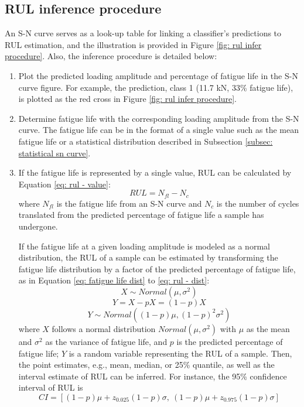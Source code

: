 \subsection{RUL inference procedure}
An S-N curve serves as a look-up table for linking a classifier's predictions to RUL estimation, and the illustration is provided in Figure \ref{fig: rul infer procedure}. Also, the inference procedure is detailed below:
\begin{enumerate}
    \item Plot the predicted loading amplitude and percentage of fatigue life in the S-N curve figure. For example, the prediction, class 1 (11.7 kN, 33\% fatigue life), is plotted as the red cross in Figure \ref{fig: rul infer procedure}.
    \item Determine fatigue life with the corresponding loading amplitude from the S-N curve. The fatigue life can be in the format of a single value such as the mean fatigue life or a statistical distribution described in Subsection \ref{subsec: statistical sn curve}.
    \item If the fatigue life is represented by a single value, RUL can be calculated by Equation \eqref{eq: rul - value}: 
    \begin{equation}
        \label{eq: rul - value}
        RUL = N_{fl} - N_{c}
    \end{equation}
    where $N_{fl}$ is the fatigue life from an S-N curve and $N_c$ is the number of cycles translated from the predicted percentage of fatigue life a sample has undergone.

    If the fatigue life at a given loading amplitude is modeled as a normal distribution, the RUL of a sample can be estimated by transforming the fatigue life distribution by a factor of the predicted percentage of fatigue life, as in Equation \eqref{eq: fatigue life dist} to \eqref{eq: rul - dist}:
    \begin{equation}
        \label{eq: fatigue life dist}
        X \sim Normal(\mu, \sigma^2)
    \end{equation}
    \begin{equation}
        \label{eq: rul transform}
        Y = X - pX = (1 - p)X
    \end{equation}
    \begin{equation}
        \label{eq: rul - dist}
        Y \sim Normal((1-p)\mu, (1-p)^2\sigma^2)
    \end{equation}
    where $X$ follows a normal distribution $Normal (\mu, \sigma^2)$ with $\mu$ as the mean and $\sigma^2$ as the variance of fatigue life, and $p$ is the predicted percentage of fatigue life; $Y$ is a random variable representing the RUL of a sample. Then, the point estimates, e.g., mean, median, or 25\% quantile, as well as the interval estimate of RUL can be inferred. For instance, the 95\% confidence interval of RUL is
    \begin{equation}
        CI = [(1-p)\mu + z_{0.025} (1-p) \sigma,\ (1-p)\mu + z_{0.975} (1-p) \sigma]
    \end{equation}
\end{enumerate}

